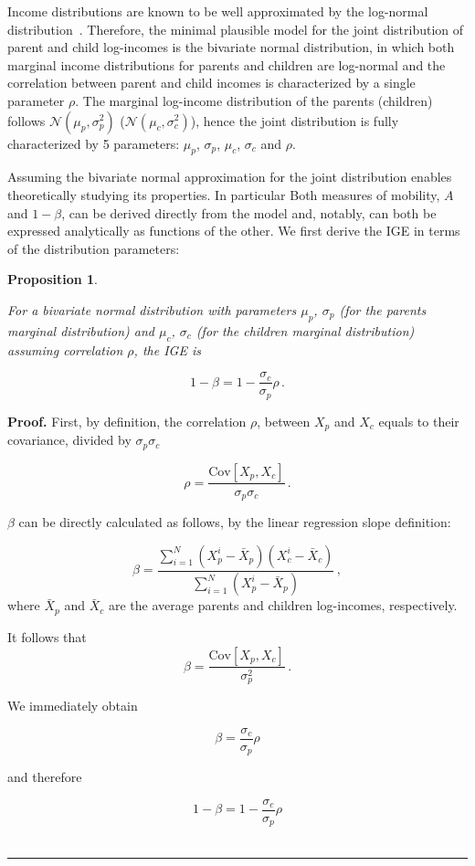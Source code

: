 \documentclass[prl,amsmath,twocolumn,nofootinbib]{revtex4}
\newcommand{\elabel}[1]{\label{eq:#1}}
\newcommand{\be}{\begin{equation}}
\newcommand{\ee}{\end{equation}}
\newtheorem{proposition}{Proposition}
\newenvironment{proof}[1][Proof]{\noindent\textbf{#1.} }{\ \rule{0.5em}{0.5em}}
\numberwithin{equation}{section}
\begin{document}
Income distributions are known to be well approximated by the log-normal distribution~\cite{pinkovskiy2009parametric}. Therefore, the minimal plausible model for the joint distribution of parent and child log-incomes is the bivariate normal distribution, in which both marginal income distributions for parents and children are log-normal and the correlation between parent and child incomes is characterized by a single parameter $\rho$. The marginal log-income distribution of the parents (children) follows $\mathcal{N}\left(\mu_p,\sigma_p^2\right)$ ($\mathcal{N}\left(\mu_c,\sigma_c^2\right)$), hence the joint distribution is fully characterized by 5 parameters: $\mu_p$, $\sigma_p$, $\mu_c$, $\sigma_c$ and $\rho$.

Assuming the bivariate normal approximation for the joint distribution enables theoretically studying its properties. In particular Both measures of mobility, $A$ and $1-\beta$, can be derived directly from the model and, notably, can both be expressed analytically as functions of the other. We first derive the IGE in terms of the distribution parameters:

\begin{proposition}
\label{prop:prop1}

For a bivariate normal distribution with parameters $\mu_p$, $\sigma_p$ (for the parents marginal distribution) and $\mu_c$, $\sigma_c$ (for the children marginal distribution) assuming correlation $\rho$, the IGE is

\be
1-\beta = 1-\frac{\sigma_c}{\sigma_p}\rho \,.
\elabel{beta_rho}
\ee
\end{proposition}

\begin{proof}
First, by definition, the correlation $\rho$, between $X_p$ and $X_c$ equals to their covariance, divided by $\sigma_p\sigma_c$

\be
\rho = \frac{\text{Cov}\left[X_p,X_c\right]}{\sigma_p\sigma_c}\,.
\ee

$\beta$ can be directly calculated as follows, by the linear regression slope definition:

\be
\beta = \frac{\sum_{i=1}^{N} {\left(X_p^i - \bar{X}_p\right)\left(X_c^i - \bar{X}_c\right)}}{\sum_{i=1}^{N} {\left(X_p^i - \bar{X}_p\right)}}\,,
\ee
where $\bar{X}_p$ and $\bar{X}_c$ are the average parents and children log-incomes, respectively.

It follows that 
\be
\beta = \frac{\text{Cov}\left[X_p,X_c\right]}{\sigma_p^2}\,.
\ee

We immediately obtain

\be
\beta = \frac{\sigma_c}{\sigma_p}\rho
\ee

and therefore

\be
1-\beta = 1-\frac{\sigma_c}{\sigma_p}\rho
\ee
\end{proof}
\end{document}
